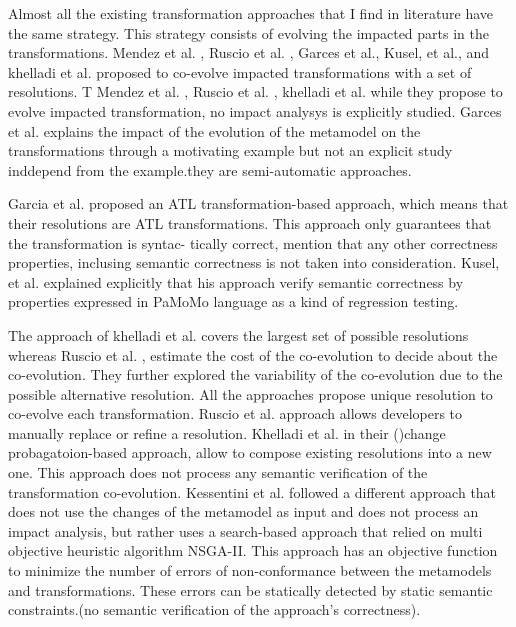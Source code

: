 Almost all the existing transformation approaches that I find in literature have the same strategy. This strategy consists of evolving the impacted parts in the transformations.
Mendez et al. \cite{mendez2010towards}, Ruscio et al. \cite{di2011needed}, Garces et al.\cite{garces2014adapting}, Kusel, et al.\cite{kusel2015consistent}, and khelladi et al. \cite{khelladi2018change} proposed to co-evolve impacted transformations with a set of resolutions. T
Mendez et al. \cite{mendez2010towards}, Ruscio et al. \cite{di2011needed}, khelladi et al. \cite{khelladi2018change} while they propose to evolve impacted transformation, no impact analysys is explicitly studied. Garces et al.\cite{garces2014adapting} explains the impact of the evolution of the metamodel on the transformations through a motivating example but not an explicit study inddepend from the example.they are semi-automatic approaches.

Garcia et al.\cite{garcia2012model} proposed an ATL transformation-based approach, which means that their resolutions are ATL transformations. This approach only guarantees that the transformation is syntac-
tically correct, mention that any other correctness properties, inclusing semantic correctness is not taken into consideration.
 Kusel, et al.\cite{kusel2015consistent} explained explicitly that his approach verify semantic correctness by properties expressed in PaMoMo language as a kind of regression testing.

The approach of khelladi et al. \cite{khelladi2018change} covers the largest set of possible resolutions whereas Ruscio et al. \cite{di2011needed}, estimate the cost of the co-evolution to decide about the co-evolution. They further explored the variability of the co-evolution due to the possible alternative resolution. All the approaches propose unique resolution to co-evolve each transformation.
Ruscio et al. \cite{di2011needed} approach allows developers to manually replace or refine a resolution. Khelladi et al. \cite{khelladi2018change}  in their ()change probagatoion-based approach,   allow to compose existing resolutions into a new one. This approach does not process any semantic verification of the transformation co-evolution.
Kessentini et al. \cite{kessentini2018automated} followed a different approach that does not use the changes of the metamodel as input and does not process an impact analysis, but rather uses a search-based approach that relied on multi objective heuristic algorithm NSGA-II. This approach has an objective function to minimize the number of errors of non-conformance between the metamodels and transformations. These errors can be statically detected by static semantic constraints.(no semantic verification of the approach's correctness).


